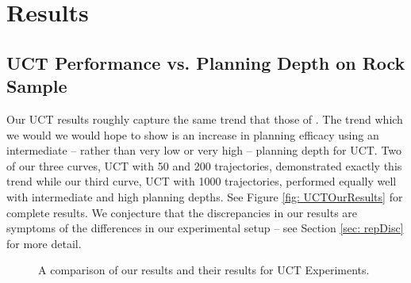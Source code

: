 \documentclass[11pt]{article} %
\begin{document}
\section{Results}


\subsection{UCT Performance vs. Planning Depth on Rock Sample}
Our UCT results roughly capture the same trend that those of \cite{jiang2015dependence}. The trend which we would we would hope to show is an increase in planning efficacy using an intermediate -- rather than very low or very high -- planning depth for UCT. Two of our three curves, UCT with 50 and 200 trajectories, demonstrated exactly this trend while our third curve, UCT with 1000 trajectories, performed equally well with intermediate and high planning depths. See Figure \ref{fig: UCTOurResults} for complete results. We conjecture that the discrepancies in our results are symptoms of the differences in our experimental setup -- see Section \ref{sec: repDisc} for more detail.

\begin{figure}
\centering
{}
\hspace{1mm}
\caption{A comparison of our results and their results for UCT Experiments.}
\end{figure}
\end{document}
